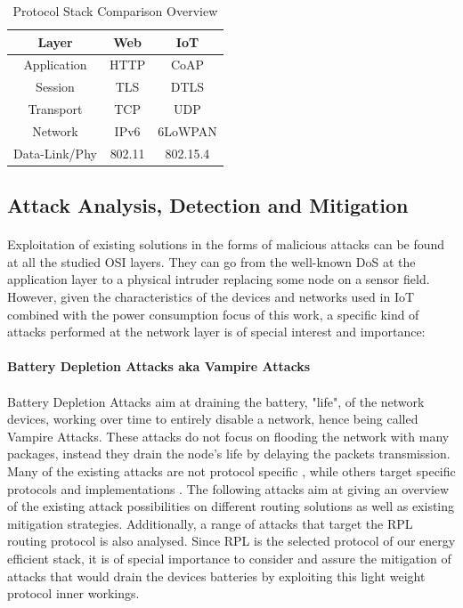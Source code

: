 \begin{table}[h]
	\centering
	\begin{center} \caption{Protocol Stack Comparison Overview } \label{tab:stack}\end{center}
	\begin{tabular}{c|c|c}
		Layer & Web & IoT \\
		\hline
		Application & \ac{HTTP} & \ac{CoAP} \\
		Session & \ac{TLS} & \ac{DTLS} \\
		Transport & \ac{TCP} & \ac{UDP} \\
		Network & IPv6 & 6LoWPAN \\
		Data-Link/Phy & 802.11 & 802.15.4
	\end{tabular}
\end{table}

\subsection{Attack Analysis, Detection and Mitigation}
\label{sec:attack_analysis}
\paragraph{}
Exploitation of existing solutions in the forms of malicious attacks can be found at all the studied OSI layers. They can go from the well-known \ac{DoS} at the application layer to a physical intruder replacing some node on a sensor field. However, given the characteristics of the devices and networks used in \ac{IoT} combined with the power consumption focus of this work, a specific kind of attacks performed at the network layer is of special interest and importance:

\paragraph{\textbf{Battery Depletion Attacks aka Vampire Attacks}}
\paragraph{}
Battery Depletion Attacks aim at draining the battery, "life", of the network devices, working over time to entirely disable a network, hence being called Vampire Attacks. These attacks do not focus on flooding the network with many packages, instead they drain the node's life by delaying the packets transmission. Many of the existing attacks are not protocol specific \cite{Vasserman2013}, while others target specific protocols and implementations \cite{Pongle2015}. The following attacks aim at giving an overview of the existing attack possibilities on different routing solutions as well as existing mitigation strategies. Additionally, a range of attacks that target the RPL routing protocol is also analysed. Since RPL is the selected protocol of our energy efficient stack, it is of special importance to consider and assure the mitigation of attacks that would drain the devices batteries by exploiting this light weight protocol inner workings.   

